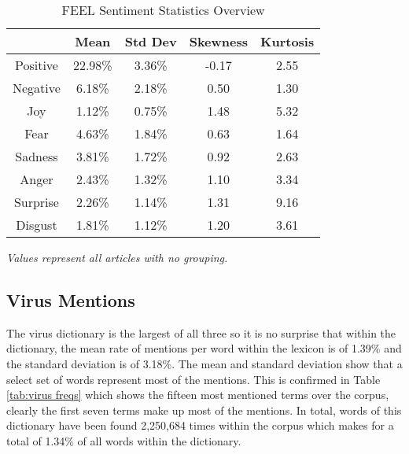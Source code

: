\begin{table}[H]
\centering
\begin{tabular}{@{}ccccc@{}}
\toprule
         & Mean    & Std Dev & Skewness & Kurtosis \\ \midrule
Positive & 22.98\% & 3.36\%  & -0.17  & 2.55   \\
Negative & 6.18\%  & 2.18\%  & 0.50   & 1.30   \\
Joy      & 1.12\%  & 0.75\%  & 1.48   & 5.32   \\
Fear     & 4.63\%  & 1.84\%  & 0.63   & 1.64   \\
Sadness  & 3.81\%  & 1.72\%  & 0.92   & 2.63   \\
Anger    & 2.43\%  & 1.32\%  & 1.10   & 3.34   \\
Surprise & 2.26\%  & 1.14\%  & 1.31   & 9.16   \\
Disgust  & 1.81\%  & 1.12\%  & 1.20   & 3.61   \\
\bottomrule
\end{tabular}
\caption{FEEL Sentiment Statistics Overview}
\label{tab:feel stats}
\emph{Values represent all articles with no grouping.}
\end{table}

\subsection{Virus Mentions}

The virus dictionary is the largest of all three so it is no surprise that within the dictionary, the mean rate of mentions per word within the lexicon is of 1.39\% and the standard deviation is of 3.18\%. The mean and standard deviation show that a select set of words represent most of the mentions. This is confirmed in Table \ref{tab:virus freqs} which shows the fifteen most mentioned terms over the corpus, clearly the first seven terms make up most of the mentions. In total, words of this dictionary have been found 2,250,684 times within the corpus which makes for a total of 1.34\% of all words within the dictionary.

